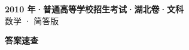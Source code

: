 \documentclass[zihao=-4, a4paper]{ctexart}
\begin{document}
\begin{center}
  {\Large\bfseries 2010 年·普通高等学校招生考试·湖北卷·文科}\\[4pt]
  {\large 数学 · 简答版}
\end{center}
\medskip
{}

\clearpage
{}
\begin{center}{\Large\bfseries 答案速查}\end{center}
\medskip

\end{document}
